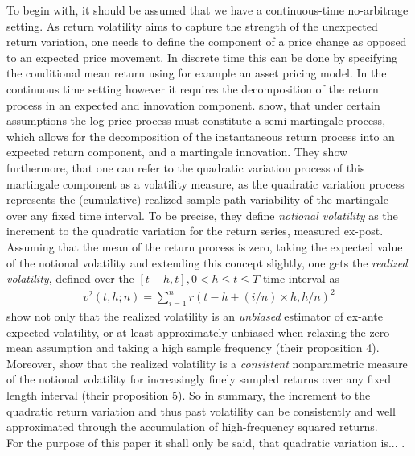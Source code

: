 To begin with, it should be assumed that we have a continuous-time no-arbitrage setting. As return volatility aims to capture the strength of the unexpected return variation, one needs to define the component of a price change as opposed to an expected price movement. In discrete time this can be done by specifying the conditional mean return using for example an asset pricing model. In the continuous time setting however it requires the decomposition of the return process in an expected and innovation component. \citeauthor{andersen2001} show, that under certain assumptions the log-price process must constitute a semi-martingale process, which allows for the decomposition of the instantaneous return process into an expected return component, and a martingale innovation. They show furthermore, that one can refer to the quadratic variation process of this martingale component as a volatility measure, as the quadratic variation process represents the (cumulative) realized sample path variability of the martingale over any fixed time interval. To be precise, they define \emph{notional volatility} as the increment to the quadratic variation for the return series, measured ex-post.\\
Assuming that the mean of the return process is zero, taking the expected value of the notional volatility and extending this concept slightly, one gets the \emph{realized volatility}, defined over the $[t-h,t], 0 < h \leq t \leq T$ time interval as
\begin{align}\label{eq:RV-andersen}
v^2(t,h;n) = \sum_{i=1}^{n} r(t-h+(i/n) \times h,h/n)^2
\end{align}
\citeauthor{andersen2001} show not only that the realized volatility is an \emph{unbiased} estimator of ex-ante expected volatility, or at least approximately unbiased when relaxing the zero mean assumption and taking a high sample frequency (their proposition 4). Moreover, \citeauthor{andersen2001} show that the realized volatility is a \emph{consistent} nonparametric measure of the notional volatility for increasingly finely sampled returns over any fixed length interval (their proposition 5). So in summary, the increment to the quadratic return variation and thus past volatility can be consistently and well approximated through the accumulation of high-frequency squared returns.\\

For the purpose of this paper it shall only be said, that quadratic variation is... .  


